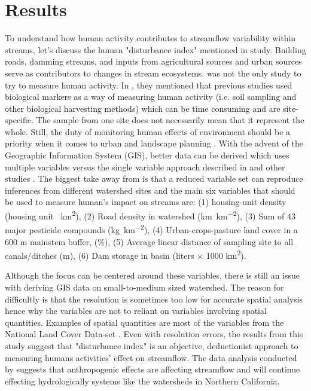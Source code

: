 \documentclass[a4paper,man,biblatex]{apa7}
\begin{document}
\section{Results}
\par To understand how human activity contributes to streamflow variability within streams, let's discuss the human "disturbance index" mentioned in \textcite{falcone_2016} study. Building roads, damming streams, and inputs from agricultural sources and urban sources serve as contributors to changes in stream ecosystems. \textcite{falcone_2016} was not the only study to try to measure human activity. In \textcite{stein_2002}, they mentioned that previous studies used biological markers as a way of measuring human activity (i.e. soil sampling and other biological harvesting methods) which can be time consuming and are site-specific. The sample from one site does not necessarily mean that it represent the whole. Still, the duty of monitoring human effects of environment should be a priority when it comes to urban and landscape planning \autocite{stein_2002}. With the advent of the Geographic Information System (GIS), better data can be derived which uses multiple variables versus the single variable approach described in \textcite{stein_2002} and other studies \autocite{falcone_2016}. The biggest take away from \textcite{falcone_2016} is that a reduced variable set can reproduce inferences from different watershed sites and the main six variables that should be used to measure human's impact on streams are: (1) housing-unit density (housing unit \si{\per\square\kilo\meter}), (2) Road density in watershed (\si{\kilo\meter\per\square\kilo\meter}), (3) Sum of 43 major pesticide compounds (\si{\kilo\gram\per\square\kilo\meter}), (4) Urban-crops-pasture land cover in a 600 m mainstem buffer, (\%), (5) Average linear distance of sampling site to all canals/ditches (m), (6) Dam storage in basin (liters $\times$ 1000 \si{\square\kilo\meter}). 
\par Although the focus can be centered around these variables, there is still an issue with deriving GIS data on small-to-medium sized watershed. The reason for difficultly is that the resolution is sometimes too low for accurate spatial analysis hence why the variables are not to reliant on variables involving spatial quantities. Examples of spatial quantities are most of the variables from the National Land Cover Data-set \autocite{falcone_2016}. Even with resolution errors, the results from this study suggest that "disturbance index" is an objective, deductionist approach to measuring humans activities' effect on streamflow. The data analysis conducted by \textcite{mallakpour_2018} suggests that anthropogenic effects are affecting streamflow  and will continue effecting hydrologically systems like the watersheds in Northern California.\\
\end{document}
